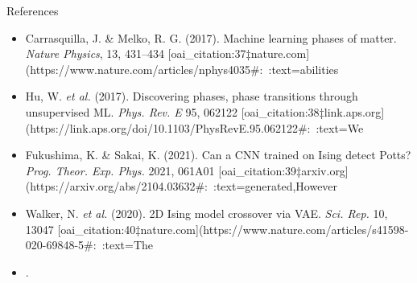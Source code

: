 \documentclass{beamer}
\begin{document}
\begin{frame}{References}
 \begin{itemize}
   \item Carrasquilla, J. \& Melko, R. G. (2017). Machine learning phases of matter. \emph{Nature Physics}, 13, 431–434 [oai_citation:37‡nature.com](https://www.nature.com/articles/nphys4035#:~:text=abilities%
   \item Hu, W. \textit{et al.} (2017). Discovering phases, phase transitions through unsupervised ML. \emph{Phys. Rev. E} 95, 062122 [oai_citation:38‡link.aps.org](https://link.aps.org/doi/10.1103/PhysRevE.95.062122#:~:text=We%
   \item Fukushima, K. \& Sakai, K. (2021). Can a CNN trained on Ising detect Potts? \emph{Prog. Theor. Exp. Phys.} 2021, 061A01 [oai_citation:39‡arxiv.org](https://arxiv.org/abs/2104.03632#:~:text=generated,However%
   \item Walker, N. \textit{et al.} (2020). 2D Ising model crossover via VAE. \emph{Sci. Rep.} 10, 13047 [oai_citation:40‡nature.com](https://www.nature.com/articles/s41598-020-69848-5#:~:text=The%
   \item [Additional references on PCA, CNN, VAE methods].
 \end{itemize}
\end{frame}
\end{document}
